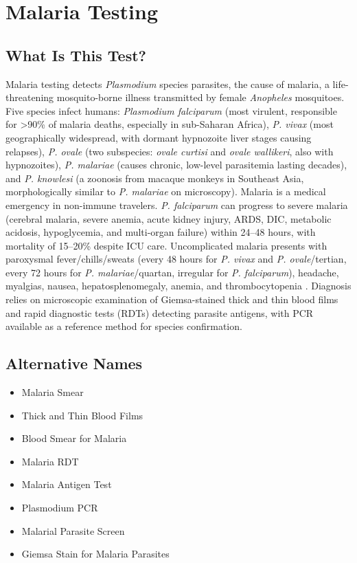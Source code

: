 \chapter{Malaria Testing}

\section*{What Is This Test?}
Malaria testing detects \textit{Plasmodium} species parasites, the cause of malaria, a life-threatening mosquito-borne illness transmitted by female \textit{Anopheles} mosquitoes. Five species infect humans: \textit{Plasmodium falciparum} (most virulent, responsible for >90\% of malaria deaths, especially in sub-Saharan Africa), \textit{P. vivax} (most geographically widespread, with dormant hypnozoite liver stages causing relapses), \textit{P. ovale} (two subspecies: \textit{ovale curtisi} and \textit{ovale wallikeri}, also with hypnozoites), \textit{P. malariae} (causes chronic, low-level parasitemia lasting decades), and \textit{P. knowlesi} (a zoonosis from macaque monkeys in Southeast Asia, morphologically similar to \textit{P. malariae} on microscopy). Malaria is a medical emergency in non-immune travelers. \textit{P. falciparum} can progress to severe malaria (cerebral malaria, severe anemia, acute kidney injury, ARDS, DIC, metabolic acidosis, hypoglycemia, and multi-organ failure) within 24--48 hours, with mortality of 15--20\% despite ICU care. Uncomplicated malaria presents with paroxysmal fever/chills/sweats (every 48 hours for \textit{P. vivax} and \textit{P. ovale}/tertian, every 72 hours for \textit{P. malariae}/quartan, irregular for \textit{P. falciparum}), headache, myalgias, nausea, hepatosplenomegaly, anemia, and thrombocytopenia \cite{white2014malaria}. Diagnosis relies on microscopic examination of Giemsa-stained thick and thin blood films and rapid diagnostic tests (RDTs) detecting parasite antigens, with PCR available as a reference method for species confirmation.

\section*{Alternative Names}
\begin{itemize}
  \item Malaria Smear
  \item Thick and Thin Blood Films
  \item Blood Smear for Malaria
  \item Malaria RDT
  \item Malaria Antigen Test
  \item Plasmodium PCR
  \item Malarial Parasite Screen
  \item Giemsa Stain for Malaria Parasites
\end{itemize}
